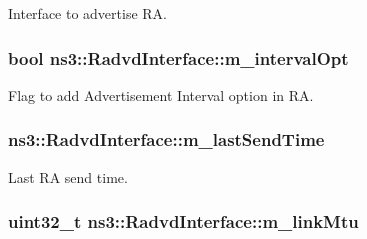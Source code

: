 Interface to advertise RA. 

\subsubsection[{\texorpdfstring{m\+\_\+interval\+Opt}{m_intervalOpt}}]{\setlength{\rightskip}{0pt plus 5cm}bool ns3\+::\+Radvd\+Interface\+::m\+\_\+interval\+Opt\hspace{0.3cm}{\ttfamily [private]}}\hypertarget{classns3_1_1RadvdInterface_a6ace6b10215006d7e2be7912eda6d6ab}{}\label{classns3_1_1RadvdInterface_a6ace6b10215006d7e2be7912eda6d6ab}


Flag to add Advertisement Interval option in RA. 

\subsubsection[{\texorpdfstring{m\+\_\+last\+Send\+Time}{m_lastSendTime}}]{ ns3\+::\+Radvd\+Interface\+::m\+\_\+last\+Send\+Time\hspace{0.3cm}{\ttfamily [private]}}\hypertarget{classns3_1_1RadvdInterface_a7bba23c4eda35bcac1709c80533b7404}{}\label{classns3_1_1RadvdInterface_a7bba23c4eda35bcac1709c80533b7404}


Last RA send time. 

\subsubsection[{\texorpdfstring{m\+\_\+link\+Mtu}{m_linkMtu}}]{\setlength{\rightskip}{0pt plus 5cm}uint32\+\_\+t ns3\+::\+Radvd\+Interface\+::m\+\_\+link\+Mtu\hspace{0.3cm}{\ttfamily [private]}}\hypertarget{classns3_1_1RadvdInterface_af5697655181c68cd0617ddd1724dd7a5}{}\label{classns3_1_1RadvdInterface_af5697655181c68cd0617ddd1724dd7a5}


